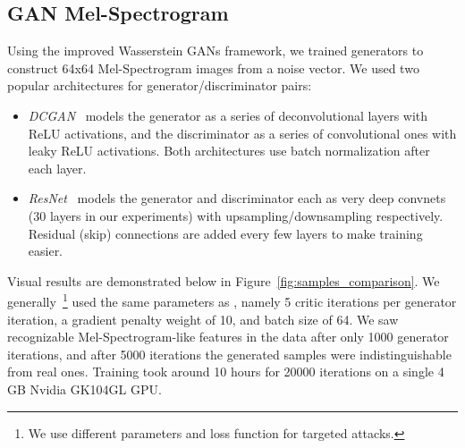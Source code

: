 \subsection{GAN Mel-Spectrogram}
Using the improved Wasserstein GANs framework, we trained generators to
construct 64x64 Mel-Spectrogram images from a noise vector. We used two popular
architectures for generator/discriminator pairs: 
\begin{itemize}
    \item \textit{DCGAN}~\cite{radford2015unsupervised} models the generator as a series of deconvolutional layers with ReLU activations, and the discriminator as a series of convolutional ones with leaky ReLU activations. Both architectures use batch normalization after each layer.
    \item \textit{ResNet}~\cite{ledig2016photo} models the generator and discriminator each as very deep convnets (30 layers in our experiments) with upsampling/downsampling respectively. Residual (skip) connections are added every few layers to make training easier.
\end{itemize}
Visual results are demonstrated below in Figure~\ref{fig:samples_comparison}. We
generally~\footnote{We use different parameters and loss function for targeted
attacks.} used the same parameters as \cite{gulrajani2017improved}, namely 5
critic iterations per generator iteration, a gradient penalty weight of 10, 
and batch size of 64. We saw recognizable Mel-Spectrogram-like features in the
data after only 1000 generator iterations, and after 5000 iterations the
generated samples were indistinguishable from real ones. Training took around 10
hours for 20000 iterations on a single 4 GB Nvidia GK104GL GPU.
